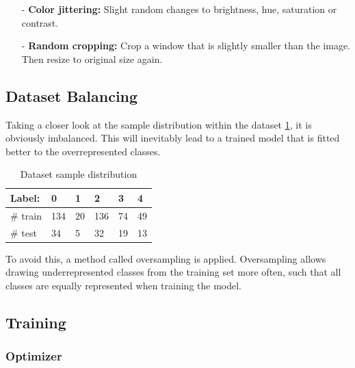\documentclass{article}
\begin{document}
\begin{itemize}
\begin{itemize}
  \end{itemize}   
  \item[-] \textbf{Color jittering:} Slight random changes to brightness, hue, saturation or contrast.
  \item[-] \textbf{Random cropping:} Crop a window that is slightly smaller than the image. Then resize to original size again.
\end{itemize}

\subsection{Dataset Balancing}
Taking a closer look at the sample distribution within the dataset \ref{tab:table1}, it is obviously imbalanced. This will inevitably lead to a trained model
that is fitted better to the overrepresented classes.

\renewcommand{\arraystretch}{1.2}
\begin{table}[h]
  \centering
  \begin{tabular}{|l|l|l|l|l|l|}
  \hline
  Label:   & 0   & 1  & 2   & 3  & 4  \\ \hline
  \# train & 134 & 20 & 136 & 74 & 49 \\ \hline
  \# test  & 34  & 5  & 32  & 19 & 13 \\ \hline
  \end{tabular}
  \caption{Dataset sample distribution}
  \label{tab:table1}
  \end{table}

To avoid this, a method called oversampling is applied. Oversampling allows drawing underrepresented classes from the training set more often, 
such that all classes are equally represented when training the model.

\subsection{Training}
\subsubsection{Optimizer}
\end{document}

